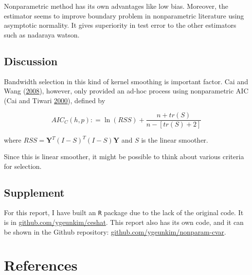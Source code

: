 \documentclass[
]{article}
\theoremstyle{definition}
\theoremstyle{definition}
\theoremstyle{definition}
\theoremstyle{remark}
\begin{document}
Nonparametric method has its own advantages like low bias. Moreover, the estimator seems to improve boundary problem in nonparametric literature using asymptotic normality. It gives superiority in test error to the other estimators such as nadaraya watson.

\hypertarget{discussion}{%
\subsection{Discussion}\label{discussion}}

Bandwidth selection in this kind of kernel smoothing is important factor. Cai and Wang (\protect\hyperlink{ref-cai:2008aa}{2008}), however, only provided an ad-hoc process using nonparametric AIC (Cai and Tiwari \protect\hyperlink{ref-cai2000application}{2000}), defined by

\begin{equation}
  AIC_{C}(h,p) \mathpunct{:}=\ln (RSS) + \frac{n + tr(S)}{n - \left[ tr(S) + 2 \right]}
  \label{eq:nonparamaic}
\end{equation}

where \(RSS = \mathbf{Y}^T(I - S)^T (I - S) \mathbf{Y}\) and \(S\) is the linear smoother.

Since this is linear smoother, it might be possible to think about various criteria for selection.

\hypertarget{supplement}{%
\subsection{Supplement}\label{supplement}}

For this report, I have built an \texttt{R} package due to the lack of the original code. It is in \href{https://github.com/ygeunkim/ceshat}{github.com/ygeunkim/ceshat}. This report also has its own code, and it can be shown in the Github repository: \href{https://github.com/ygeunkim/nonparam-cvar}{github.com/ygeunkim/nonparam-cvar}.

\newpage

\hypertarget{references}{%
\section*{References}\label{references}}
\end{document}
